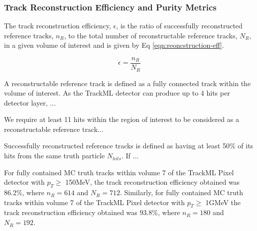 \subsubsection{Track Reconstruction Efficiency and Purity Metrics}

The track reconstruction efficiency, $\epsilon$, is the ratio of successfully reconstructed reference tracks, $n_R$, to the total number of reconstructable reference tracks, $N_R$, in a given volume of interest and is given by Eq \eqref{eqn:reoncstruction-eff}. 


\begin{equation}
    \epsilon = \frac{n_R}{N_R}
    \label{eqn:reoncstruction-eff}
\end{equation}

A reconstructable reference track is defined as a fully connected track within the volume of interest. As the TrackML detector can produce up to 4 hits per detector layer, ...


We require at least 11 hits within the region of interest to be considered as a reconstructable reference track...

Successfully reconstructed reference tracks is defined as having at least 50\% of its hits from the same truth particle $N_{hits}$. If ...

For fully contained MC truth tracks within volume 7 of the TrackML Pixel detector with $p_{T} \geq$ 150MeV, the track reconstruction efficiency obtained was 86.2\%, where $n_R = 614$ and $N_R = 712$. Similarly, for fully contained MC truth tracks within volume 7 of the TrackML Pixel detector with $p_{T} \geq$ 1GMeV the track reconstruction efficiency obtained was 93.8\%, where $n_R = 180$ and $N_R = 192$.






